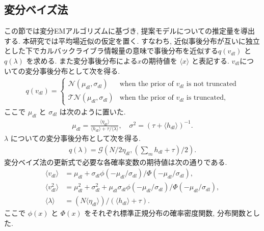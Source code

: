 \documentclass[a4paper,12ptc]{jsarticle} %
\newcommand{\normal}{\mathcal{N}}
\newcommand{\truncnorm}{\mathcal{TN}}
\newcommand{\gam}{\mathcal{G}}
\begin{document}
\subsection{変分ベイズ法}
\label{est_sec}
この節では変分EMアルゴリズム\cite{Jordan}に基づき, 提案モデルについての推定量を導出する. 
本研究では平均場近似の仮定を置く. すなわち, 近似事後分布が互いに独立とした下でカルバックライブラ情報量の意味で事後分布を近似する$q(v_{dl})$ と $q(\lambda)$ を求める. また変分事後分布による$x$の期待値を $\langle x \rangle$ と表記する.
$v_{dl}$についての変分事後分布として次を得る.
\begin{align}
q(v_{dl})= \begin{cases}
\normal(\mu_{dl}, \sigma_{dl}) & \mbox{when the prior of $v_{dl}$ is not truncated} \\
\truncnorm(\mu_{dl}, \sigma_{dl}) & \mbox{when the prior of $v_{dl}$ is truncated},     
\end{cases} \label{qv}
\end{align}
ここで $\mu_{dl}$ と $\sigma_{dl}$ は次のように置いた.
\begin{align*}
\mu_{dl} =\frac{\langle \eta_{dl} \rangle}{\langle h_{dl}\rangle+\tau/\langle\lambda\rangle}, \quad \sigma^2 =\left(\tau + \langle h_{dl} \rangle \right)^{-1}.
\end{align*}
$\lambda$ についての変分事後分布として次を得る. 
\begin{align}
    q(\lambda) = \gam \left(N/2 \eta_{dl}, \left(\sum_m h_{dl}+\tau\right)/2\right). \label{qlam}
\end{align}
変分ベイズ法の更新式で必要な各確率変数の期待値は次の通りである.
\begin{align*}
\langle v_{dl}\rangle &=\mu_{dl} + \sigma_{dl} \phi(-\mu_{dl}/\sigma_{dl})/\Phi(-\mu_{dl}/\sigma_{dl}),\\
\langle v_{dl}^2 \rangle&=\mu_{dl}^2 + \sigma_{dl}^2 + \mu_{dl} \sigma_{dl} \phi(-\mu_{dl}/\sigma_{dl})/\Phi(-\mu_{dl}/\sigma_{dl}),\\
\langle \lambda \rangle &= (N \langle \eta_{dl} \rangle ) / \left( \langle h_{dl} \rangle +\tau\right).
\end{align*}
ここで $\phi(x)$ と $\Phi(x)$ をそれぞれ標準正規分布の確率密度関数, 分布関数とした.
\end{document}
